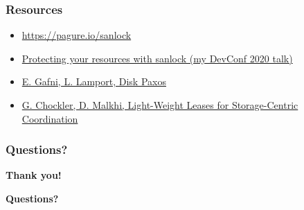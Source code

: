 \documentclass[10pt,utf8]{beamer}
\begin{document}
\begin{frame}
    \frametitle{Resources}
    \begin{itemize}
    \item \small \color{blue}\url{https://pagure.io/sanlock}\color{black}
    \item \color{blue}\href{https://www.youtube.com/watch?v=we0zW7ekfAI}{Protecting your resources with sanlock (my DevConf 2020 talk)}\color{black}
     \item \color{blue}\href{http://lamport.azurewebsites.net/pubs/disk-paxos-disc.pdf}{E. Gafni, L. Lamport, Disk Paxos}\color{black}
     \item \color{blue}\href{https://groups.csail.mit.edu/tds/papers/Chockler/TR934.ps}{G. Chockler, D. Malkhi, Light-Weight Leases for Storage-Centric Coordination}\color{black}
    \end{itemize}
\end{frame}

\begin{frame}
    \frametitle{Questions?}
    \centering
     \textbf{\Huge{Thank you!}}
    
    \vspace{1.5cm}
    
    \textbf{\Huge{Questions?}}
\end{frame}
\end{document}
